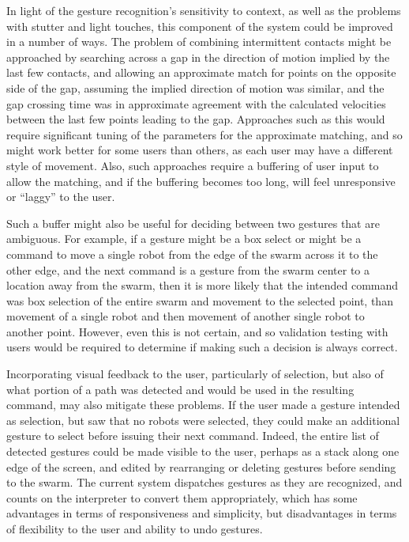 In light of the gesture recognition's sensitivity to context, as well as the problems with stutter and light touches, this component of the system could be improved in a number of ways. 
The problem of combining intermittent contacts might be approached by searching across a gap in the direction of motion implied by the last few contacts, and allowing an approximate match for points on the opposite side of the gap, assuming the implied direction of motion was similar, and the gap crossing time was in approximate agreement with the calculated velocities between the last few points leading to the gap. 
Approaches such as this would require significant tuning of the parameters for the approximate matching, and so might work better for some users than others, as each user may have a different style of movement. 
Also, such approaches require a buffering of user input to allow the matching, and if the buffering becomes too long, will feel unresponsive or ``laggy'' to the user. 

Such a buffer might also be useful for deciding between two gestures that are ambiguous. 
For example, if a gesture might be a box select or might be a command to move a single robot from the edge of the swarm across it to the other edge, and the next command is a gesture from the swarm center to a location away from the swarm, then it is more likely that the intended command was box selection of the entire swarm and movement to the selected point, than movement of a single robot and then movement of another single robot to another point. 
However, even this is not certain, and so validation testing with users would be required to determine if making such a decision is always correct. 

Incorporating visual feedback to the user, particularly of selection, but also of what portion of a path was detected and would be used in the resulting command, may also mitigate these problems. 
If the user made a gesture intended as selection, but saw that no robots were selected, they could make an additional gesture to select before issuing their next command. 
Indeed, the entire list of detected gestures could be made visible to the user, perhaps as a stack along one edge of the screen, and edited by rearranging or deleting gestures before sending to the swarm. 
The current system dispatches gestures as they are recognized, and counts on the interpreter to convert them appropriately, which has some advantages in terms of responsiveness and simplicity, but disadvantages in terms of flexibility to the user and ability to undo gestures. 


